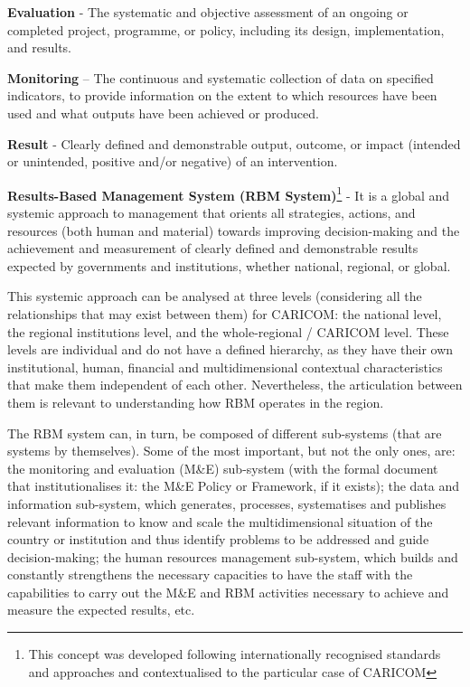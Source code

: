 \documentclass[
]{book}
\begin{document}
\textbf{Evaluation} - The systematic and objective assessment of an ongoing or completed project, programme, or policy, including its design, implementation, and results.

\textbf{Monitoring} -- The continuous and systematic collection of data on specified indicators, to provide information on the extent to which resources have been used and what outputs have been achieved or produced.

\textbf{Result} - Clearly defined and demonstrable output, outcome, or impact (intended or unintended, positive and/or negative) of an intervention.

\textbf{Results-Based Management System (RBM System)}\footnote{This concept was developed following internationally recognised standards and approaches and contextualised to the particular case of CARICOM} - It is a global and systemic approach to management that orients all strategies, actions, and resources (both human and material) towards improving decision-making and the achievement and measurement of clearly defined and demonstrable results expected by governments and institutions, whether national, regional, or global.

This systemic approach can be analysed at three levels (considering all the relationships that may exist between them) for CARICOM: the national level, the regional institutions level, and the whole-regional / CARICOM level. These levels are individual and do not have a defined hierarchy, as they have their own institutional, human, financial and multidimensional contextual characteristics that make them independent of each other. Nevertheless, the articulation between them is relevant to understanding how RBM operates in the region.

The RBM system can, in turn, be composed of different sub-systems (that are systems by themselves). Some of the most important, but not the only ones, are: the monitoring and evaluation (M\&E) sub-system (with the formal document that institutionalises it: the M\&E Policy or Framework, if it exists); the data and information sub-system, which generates, processes, systematises and publishes relevant information to know and scale the multidimensional situation of the country or institution and thus identify problems to be addressed and guide decision-making; the human resources management sub-system, which builds and constantly strengthens the necessary capacities to have the staff with the capabilities to carry out the M\&E and RBM activities necessary to achieve and measure the expected results, etc.
\end{document}
